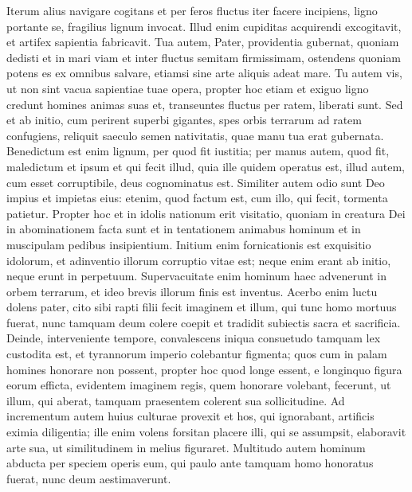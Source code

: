 \begin{biblechapter}  
\verse Iterum alius navigare cogitans et per feros fluctus iter facere incipiens, ligno portante se, fragilius lignum invocat. 
\verse Illud enim cupiditas acquirendi excogitavit, et artifex sapientia fabricavit. 
\verse Tua autem, Pater, providentia gubernat, quoniam dedisti et in mari viam et inter fluctus semitam firmissimam, 
\verse ostendens quoniam potens es ex omnibus salvare, etiamsi sine arte aliquis adeat mare. 
\verse Tu autem vis, ut non sint vacua sapientiae tuae opera, propter hoc etiam et exiguo ligno credunt homines animas suas et, transeuntes fluctus per ratem, liberati sunt. 
\verse Sed et ab initio, cum perirent superbi gigantes, spes orbis terrarum ad ratem confugiens, reliquit saeculo semen nativitatis, quae manu tua erat gubernata. 
\verse Benedictum est enim lignum, per quod fit iustitia; 
\verse per manus autem, quod fit, maledictum et ipsum et qui fecit illud, quia ille quidem operatus est, illud autem, cum esset corruptibile, deus cognominatus est. 
\verse Similiter autem odio sunt Deo impius et impietas eius: 
\verse etenim, quod factum est, cum illo, qui fecit, tormenta patietur. 
\verse Propter hoc et in idolis nationum erit visitatio, quoniam in creatura Dei in abominationem facta sunt et in tentationem animabus hominum et in muscipulam pedibus insipientium. 
\verse Initium enim fornicationis est exquisitio idolorum, et adinventio illorum corruptio vitae est; 
\verse neque enim erant ab initio, neque erunt in perpetuum. 
\verse Supervacuitate enim hominum haec advenerunt in orbem terrarum, et ideo brevis illorum finis est inventus. 
\verse Acerbo enim luctu dolens pater, cito sibi rapti filii fecit imaginem et illum, qui tunc homo mortuus fuerat, nunc tamquam deum colere coepit et tradidit subiectis sacra et sacrificia. 
\verse Deinde, interveniente tempore, convalescens iniqua consuetudo tamquam lex custodita est, et tyrannorum imperio colebantur figmenta; 
\verse quos cum in palam homines honorare non possent, propter hoc quod longe essent, e longinquo figura eorum efficta, evidentem imaginem regis, quem honorare volebant, fecerunt, ut illum, qui aberat, tamquam praesentem colerent sua sollicitudine. 
\verse Ad incrementum autem huius culturae provexit et hos, qui ignorabant, artificis eximia diligentia; 
\verse ille enim volens forsitan placere illi, qui se assumpsit, elaboravit arte sua, ut similitudinem in melius figuraret. 
\verse Multitudo autem hominum abducta per speciem operis eum, qui paulo ante tamquam homo honoratus fuerat, nunc deum aestimaverunt. 

\end{biblechapter}
